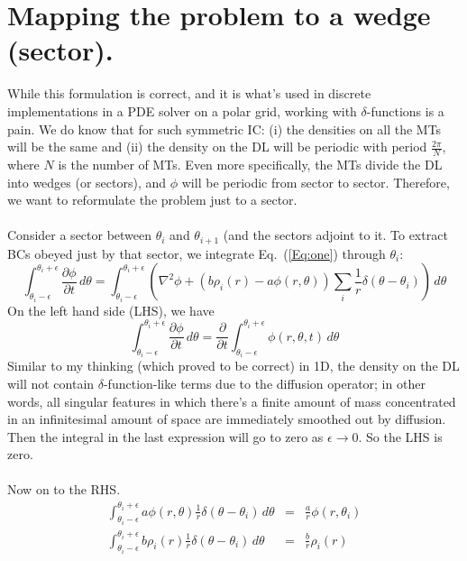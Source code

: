 \documentclass{article}
\begin{document}
\section{Mapping the problem to a wedge (sector).}
While this formulation is correct, and it is what's used in discrete implementations in a PDE solver on a polar grid, working with $\delta$-functions is a pain.  We do know that for such symmetric IC: (i) the densities on all the MTs will be the same and (ii) the density on the DL will be periodic with period $\frac{2 \pi}{N}$, where $N$ is the number of MTs.  Even more specifically, the MTs divide the DL into wedges (or sectors), and $\phi$ will be periodic from sector to sector. Therefore, we want to reformulate the problem just to a sector.
\\
\\
Consider a sector between $\theta_i$ and $\theta_{i+1}$ (and the sectors adjoint to it.  To extract BCs obeyed just by that sector, we integrate Eq.~(\ref{Eq:one}) through $\theta_i$:
\begin{displaymath}
\int_{\theta_i - \epsilon}^{\theta_i + \epsilon} \frac{\partial \phi}{\partial t} \,d\theta = \int_{\theta_i - \epsilon}^{\theta_i + \epsilon} \left(\nabla^2 \phi +\left(b \rho_i(r) - a \phi(r,\theta)\right)\sum_{i}\frac{1}{r}\delta(\theta - \theta_i)\right) \,d\theta
\end{displaymath}
On the left hand side (LHS), we have
\begin{displaymath}
\int_{\theta_i - \epsilon}^{\theta_i + \epsilon} \frac{\partial \phi}{\partial t} \,d\theta  = \frac{\partial}{\partial t} \int_{\theta_i - \epsilon}^{\theta_i + \epsilon} \phi(r,\theta,t)\,d\theta 
\end{displaymath}
Similar to my thinking (which proved to be correct) in 1D, the density on the DL will not contain $\delta$-function-like terms due to the diffusion operator;  in other words, all singular features in which there's a finite amount of mass concentrated in an infinitesimal amount of space are immediately smoothed out by diffusion.  Then the integral in the last expression will go to zero as $\epsilon \rightarrow 0$.  So the LHS is zero.
\\
\\
Now on to the RHS. 
\begin{eqnarray*}
\int_{\theta_i - \epsilon}^{\theta_i + \epsilon} a \phi(r,\theta) \frac{1}{r}\delta(\theta - \theta_i) \,d\theta &=& \frac{a}{r} \phi(r,\theta_i) \\
\int_{\theta_i - \epsilon}^{\theta_i + \epsilon} b \rho_i(r) \frac{1}{r} \delta(\theta - \theta_i) \,d\theta &=& \frac{b}{r} \rho_i(r)
\end{eqnarray*}
\end{document}
